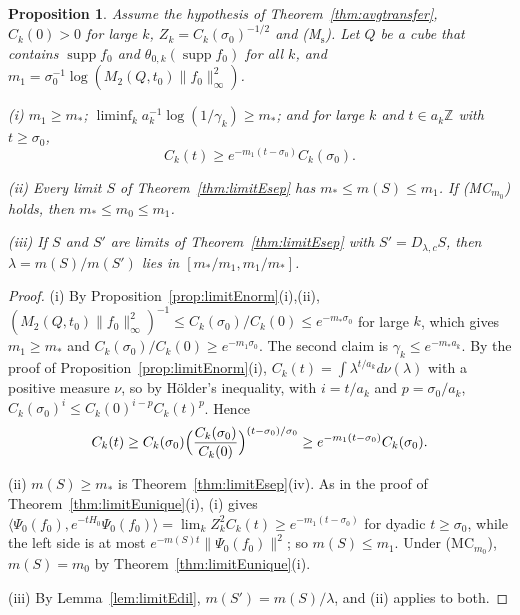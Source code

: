 \documentclass[aps,prd,twocolumn,superscriptaddress,nofootinbib,longbibliography,floatfix,amsmath,amssymb,10pt]{revtex4-2}
\newtheorem{proposition}[theorem]{Proposition}
\theoremstyle{definition}
\theoremstyle{remark}
\newcommand{\Z}{\mathbb{Z}}
\newcommand{\ip}[2]{\langle #1,#2\rangle}
\begin{document}
\begin{proposition}\label{prop:limitEbracket}
Assume the hypothesis of Theorem~\textup{\ref{thm:avgtransfer}},
$C_k(0)>0$ for large $k$, $Z_k=C_k(\sigma_0)^{-1/2}$ and
\textup{(M$_{\mathrm s}$)}. Let $Q$ be a cube that contains
$\operatorname{supp}f_0$ and $\theta_{0,k}(\operatorname{supp}f_0)$ for all
$k$, and $m_1=\sigma_0^{-1}\log(M_2(Q,t_0)\|f_0\|_\infty^2)$.

\textup{(i)} $m_1\ge m_*$; $\liminf_ka_k^{-1}\log(1/\gamma_k)\ge m_*$; and
for large $k$ and $t\in a_k\Z$ with $t\ge\sigma_0$,
\[
C_k(t)\ge e^{-m_1(t-\sigma_0)}C_k(\sigma_0) .
\]

\textup{(ii)} Every limit $S$ of Theorem~\textup{\ref{thm:limitEsep}} has
$m_*\le m(S)\le m_1$. If \textup{(MC$_{m_0}$)} holds, then $m_*\le m_0\le
m_1$.

\textup{(iii)} If $S$ and $S'$ are limits of
Theorem~\textup{\ref{thm:limitEsep}} with $S'=D_{\lambda,c}S$, then
$\lambda=m(S)/m(S')$ lies in $[m_*/m_1,m_1/m_*]$.
\end{proposition}

\begin{proof}
(i) By Proposition~\ref{prop:limitEnorm}(i),(ii), $(M_2(Q,t_0)\|f_0\|_\infty^2
)^{-1}\le C_k(\sigma_0)/C_k(0)\le e^{-m_*\sigma_0}$ for large $k$, which gives
$m_1\ge m_*$ and $C_k(\sigma_0)/C_k(0)\ge e^{-m_1\sigma_0}$. The second claim
is $\gamma_k\le e^{-m_*a_k}$. By the proof of
Proposition~\ref{prop:limitEnorm}(i), $C_k(t)=\int\lambda^{t/a_k}d\nu(
\lambda)$ with a positive measure $\nu$, so by H\"older's inequality, with
$i=t/a_k$ and $p=\sigma_0/a_k$, $C_k(\sigma_0)^i\le C_k(0)^{i-p}C_k(t)^p$.
Hence
\[
C_k(t)\ge C_k(\sigma_0)\Bigl(\frac{C_k(\sigma_0)}{C_k(0)}\Bigr)^{(t-\sigma_0)/
\sigma_0}\ge e^{-m_1(t-\sigma_0)}C_k(\sigma_0) .
\]

(ii) $m(S)\ge m_*$ is Theorem~\ref{thm:limitEsep}(iv). As in the proof of
Theorem~\ref{thm:limitEunique}(i), (i) gives $\ip{\Psi_0(f_0)}{e^{-tH_0}
\Psi_0(f_0)}=\lim_kZ_k^2C_k(t)\ge e^{-m_1(t-\sigma_0)}$ for dyadic
$t\ge\sigma_0$, while the left side is at most $e^{-m(S)t}\|\Psi_0(f_0)
\|^2$; so $m(S)\le m_1$. Under (MC$_{m_0}$), $m(S)=m_0$ by
Theorem~\ref{thm:limitEunique}(i).

(iii) By Lemma~\ref{lem:limitEdil}, $m(S')=m(S)/\lambda$, and (ii)
applies to both.
\end{proof}
\end{document}
